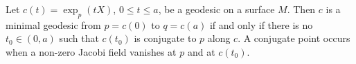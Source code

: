 Let $c(t) = \exp_p(t X)$, $0 \leq t \leq a$, be a geodesic on a surface $M$. Then $c$ is a minimal geodesic from $p = c(0)$ to $q = c(a)$ if and only if there is no $t_0 \in (0, a)$ such that $c(t_0)$ is conjugate to $p$ along $c$. A conjugate point occurs when a non-zero Jacobi field vanishes at $p$ and at $c(t_0)$.